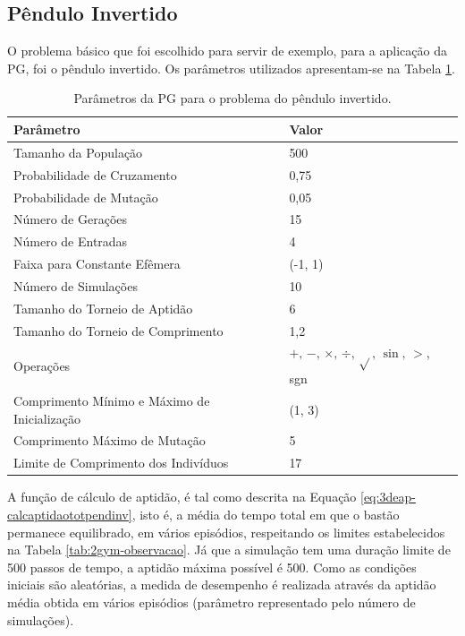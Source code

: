 \subsection{Pêndulo Invertido}\label{ssec:4ec-cartpole}

O problema básico que foi escolhido para servir de exemplo, para a aplicação da PG, foi o pêndulo invertido. Os parâmetros utilizados apresentam-se na Tabela \ref{tab:4ec-param-cartpole}.

\begin{table}[H]
	\centering
	\begin{tabular}{l|l} \toprule
		{Parâmetro} & {Valor} \\ \midrule
		{Tamanho da População} & {500} \\
		{Probabilidade de Cruzamento} & {0,75} \\
		{Probabilidade de Mutação} & {0,05} \\
		{Número de Gerações} & {15} \\
		{Número de Entradas} & {4} \\
		{Faixa para Constante Efêmera} & {(-1, 1)} \\
		{Número de Simulações} & {10} \\
		{Tamanho do Torneio de Aptidão} & {6} \\
		{Tamanho do Torneio de Comprimento} & {1,2} \\
		{Operações} & {$+,\,-,\,\times,\,\div,\,\sqrt{},\,\sin,\,>$, sgn} \\
		{Comprimento Mínimo e Máximo de Inicialização} & {(1, 3)} \\
		{Comprimento Máximo de Mutação} & {5} \\
		{Limite de Comprimento dos Indivíduos} & {17} \\
		\bottomrule
	\end{tabular}
	\caption{Parâmetros da PG para o problema do pêndulo invertido.}\label{tab:4ec-param-cartpole}
\end{table}

A função de cálculo de aptidão, é tal como descrita na Equação \ref{eq:3deap-calcaptidaototpendinv}, isto é, a média do tempo total em que o bastão permanece equilibrado, em vários episódios, respeitando os limites estabelecidos na Tabela \ref{tab:2gym-observacao}. Já que a simulação tem uma duração limite de 500 passos de tempo, a aptidão máxima possível é 500. Como as condições iniciais são aleatórias, a medida de desempenho é realizada através da aptidão média obtida em vários episódios (parâmetro representado pelo número de simulações).

